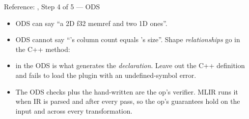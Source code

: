 \documentclass[aspectratio=169,10pt]{beamer}
\begin{document}
\begin{frame}{Reference: , Step 4 of 5 --- ODS}
  \begin{itemize}
    \item<1-> ODS can say ``\alert{a 2D f32 memref and two 1D ones}''.
    \item<2-> ODS \alert{cannot} say ``'s column count equals
      's size''. Shape \emph{relationships} go in the C++
      \alert{} method:
  \end{itemize}
  \vspace{0.3em}
  \vspace{0.3em}
  \begin{itemize}
    \item<3->  in the ODS is what generates the
       \emph{declaration}. Leave out the C++ definition and
       fails to load the plugin with an undefined-symbol error.
    \item<4-> The ODS checks plus the hand-written  are the op's
      \alert{verifier}. MLIR runs it when IR is \alert{parsed} and
      \alert{after every pass}, so the op's guarantees hold on the input and
      across every transformation.
  \end{itemize}
\end{frame}
\end{document}
